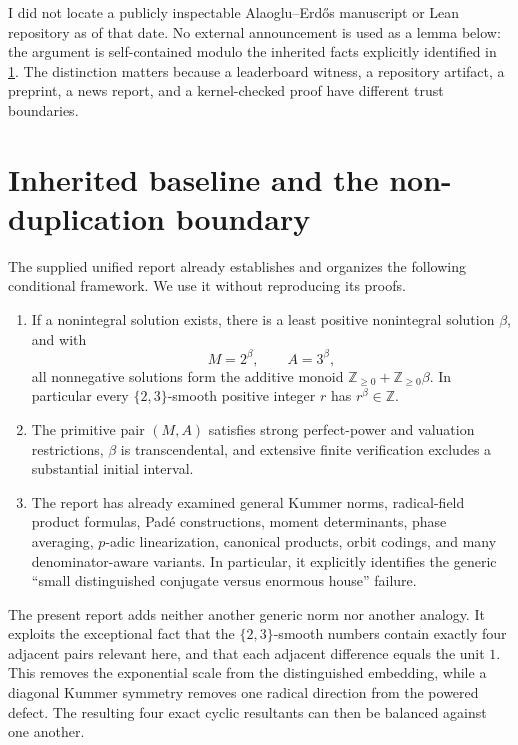 \documentclass[11pt]{article}
\theoremstyle{definition}
\theoremstyle{remark}
\newcommand{\ZZ}{\mathbb Z}
\newcommand{\statusinherited}{\textnormal{\sffamily[inherited]}}
\begin{document}
I did not locate a publicly inspectable Alaoglu--Erd\H{o}s manuscript or Lean repository as of that date.  No external announcement is used as a lemma below: the argument is self-contained modulo the inherited facts explicitly identified in \cref{sec:baseline}.  The distinction matters because a leaderboard witness, a repository artifact, a preprint, a news report, and a kernel-checked proof have different trust boundaries.

\section{Inherited baseline and the non-duplication boundary}\label{sec:baseline}

The supplied unified report already establishes and organizes the following conditional framework.  We use it without reproducing its proofs.

\begin{enumerate}
\item If a nonintegral solution exists, there is a least positive nonintegral solution \(\beta\), and with
\[
M=2^\beta,\qquad A=3^\beta,
\]
all nonnegative solutions form the additive monoid
\(\ZZ_{\ge0}+\ZZ_{\ge0}\beta\).  In particular every \(\{2,3\}\)-smooth positive integer \(r\) has \(r^\beta\in\ZZ\). \statusinherited

\item The primitive pair \((M,A)\) satisfies strong perfect-power and valuation restrictions, \(\beta\) is transcendental, and extensive finite verification excludes a substantial initial interval. \statusinherited

\item The report has already examined general Kummer norms, radical-field product formulas, Pad\'e constructions, moment determinants, phase averaging, \(p\)-adic linearization, canonical products, orbit codings, and many denominator-aware variants.  In particular, it explicitly identifies the generic ``small distinguished conjugate versus enormous house'' failure. \statusinherited
\end{enumerate}

The present report adds neither another generic norm nor another analogy.  It exploits the exceptional fact that the \(\{2,3\}\)-smooth numbers contain exactly four adjacent pairs relevant here, and that each adjacent difference equals the unit \(1\).  This removes the exponential scale from the distinguished embedding, while a diagonal Kummer symmetry removes one radical direction from the powered defect.  The resulting four exact cyclic resultants can then be balanced against one another.
\end{document}
